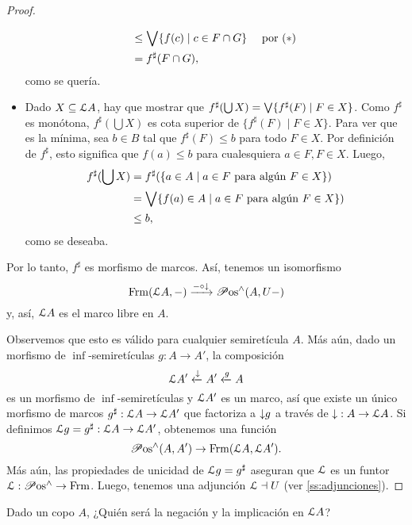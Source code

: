 \begin{proof}
\begin{itemize}
\begin{align*}
            &\leq \Sup\{f(c) \mid c\in F\cap G\}
                && \text{ por $(*)$ } \\
            &= f^\sharp(F\cap G),
        \end{align*}
        como se quería.
        \item
        Dado $X\subseteq \cal LA$, hay que mostrar que
        $f^\sharp(\bigcup X)=\Sup\{f^\sharp(F) \mid F\in X\}$.
        Como $f^\sharp$ es monótona,
        $f^\sharp(\bigcup X)$ es cota superior de
        $\{f^\sharp(F) \mid F\in X\}$.
        Para ver que es la mínima, sea $b\in B$ tal que
        $f^\sharp(F)\leq b$ para todo $F\in X$.
        Por definición de $f^\sharp$, esto significa que
        $f(a)\leq b$ para cualesquiera $a\in F, F\in X$.
        Luego,
        \begin{align*}
            f^\sharp(\bigcup X)
            &= f^\sharp (
            \{a\in A \mid a\in F\text{ para algún }F\in X\}
            ) \\
            &=
            \Sup\{f(a)\in A \mid a\in F\text{ para algún }F\in X\}) \\
            &\leq b,
        \end{align*}
        como se deseaba.
    \end{itemize}
    Por lo tanto, $f^\sharp$ es morfismo de marcos.
    Así, tenemos un isomorfismo
    \[
        \Frm(\cal LA,-)\xto{-\circ \down} \Pos^{\inf}(A,U-)
    \]
    y, así, $\cal LA$ es el marco libre en $A$.
    
    Observemos que esto es válido para cualquier
    semiretícula $A$.
    Más aún, dado un morfismo de $\inf$-semiretículas
    $g:A\to A'$, la composición
    \[
        \cal LA' \lar \down A' \lar g A
    \]
    es un morfismo de $\inf$-semiretículas y
    $\cal LA'$ es un marco, así que
    existe un único morfismo de marcos
    $g^\sharp:\cal LA\to \cal LA'$ que factoriza a
    $\down g$ a través de $\down:A\to \cal LA$.
    Si definimos $\cal Lg=g^\sharp:\cal LA\to\cal LA'$,
    obtenemos una función
    \[
        \Pos^{\inf}(A,A') \to \Frm(\cal LA,\cal LA')
    .\]
    Más aún, las propiedades de unicidad de
    $\cal Lg=g^\sharp$ aseguran que $\cal L$ es un funtor
    $\cal L:\Pos^{\inf}\to\Frm$.
    Luego, tenemos una adjunción $\cal L\dashv U$
    (ver \ref{ss:adjunciones}).
\end{proof}

\begin{exercise}%
  Dado un copo $A$,
  ¿Quién será la negación y la implicación en $\cal LA$?
\end{exercise}


